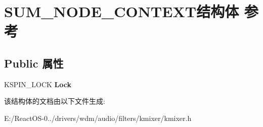 \hypertarget{struct_s_u_m___n_o_d_e___c_o_n_t_e_x_t}{}\section{S\+U\+M\+\_\+\+N\+O\+D\+E\+\_\+\+C\+O\+N\+T\+E\+X\+T结构体 参考}
\label{struct_s_u_m___n_o_d_e___c_o_n_t_e_x_t}
\subsection*{Public 属性}
\begin{DoxyCompactItemize}
\item 
\mbox{\label{struct_s_u_m___n_o_d_e___c_o_n_t_e_x_t_acf847b1f65adbdf8ad2a9e332704440b}} 
K\+S\+P\+I\+N\+\_\+\+L\+O\+CK {\bfseries Lock}
\end{DoxyCompactItemize}


该结构体的文档由以下文件生成\+:\begin{DoxyCompactItemize}
\item 
E\+:/\+React\+O\+S-\/0../drivers/wdm/audio/filters/kmixer/kmixer.\+h\end{DoxyCompactItemize}
